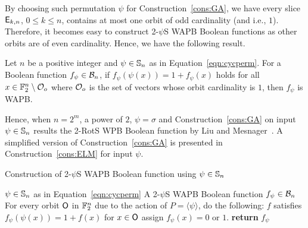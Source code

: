 \documentclass{llncs}
\begin{document}
By choosing such permutation $\psi$ for Construction~\ref{cons:GA}, we have every slice $\mathsf{E}_{k,n}$, $0 \leq k \leq n$, contains at most one orbit of odd cardinality (and i.e., $1$). Therefore, it becomes easy to construct 2-$\psi$S WAPB Boolean functions as other orbits are of even cardinality. Hence, we have the following result.
\begin{theorem}\label{thm:WAPB}
Let $n$ be a positive integer and $\psi \in \mathbb{S}_n$ as in Equation~\ref{eqn:cycperm}.
For a Boolean function $f_\psi \in \mathcal{B}_n$, if $f_\psi(\psi(x)) = 1+f_\psi(x)$ holds for all $x \in \mathbb{F}_2^n \setminus \mathcal{O}_o$ where $\mathcal{O}_o$ is the set of vectors whose orbit cardinality is $1$, then $f_\psi$ is WAPB.
\end{theorem}
Hence, when $n = 2^m$, a power of $2$, $\psi = \sigma$ and Construction~\ref{cons:GA} on input $\psi \in \mathbb{S}_n$ results the 2-RotS WPB Boolean function by Liu and Mesnager~\cite{DCC:LiuMes19}. A simplified version of Construction~\ref{cons:GA} is presented in Construction~\ref{cons:ELM} for input $\psi$.


\begin{constr}\label{cons:ELM}
\caption{Construction of 2-$\psi$S WAPB Boolean function using $\psi \in \mathbb{S}_n$}
\begin{algorithmic}%
\Require $\psi \in \mathbb{S}_n$ as in Equation~\ref{eqn:cycperm}
\Ensure A 2-$\psi$S WAPB Boolean function $f_\psi \in \mathcal{B}_n$
\State For every orbit $\mathsf{O}$ in $\mathbb{F}_2^n$ due to the action of $P = \langle \psi \rangle$, do the following:
	\State $f$ satisfies $f_\psi(\psi(x)) = 1+f(x)$ for $x \in \mathsf{O}$
\EndIf
{}
	\State assign $f_\psi(x) = 0$ or $1$.%
\EndIf
\State \textbf{return} $f_\psi$
\end{algorithmic}
\end{constr}
\end{document}
